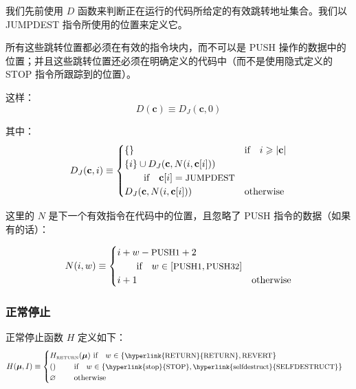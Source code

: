 \documentclass[9pt,oneside]{amsart}
\makeatletter
\newcommand{\linkdest}[1]{\Hy@raisedlink{\hypertarget{#1}{}}}
\makeatother
\begin{document}
\begin{multicols}{2}
我们先前使用 $D$ 函数来判断正在运行的代码所给定的有效跳转地址集合。我们以 {\small JUMPDEST} 指令所使用的位置来定义它。

所有这些跳转位置都必须在有效的指令块内，而不可以是 {\small PUSH} 操作的数据中的位置；并且这些跳转位置还必须在明确定义的代码中（而不是使用隐式定义的 {\small STOP} 指令所跟踪到的位置）。

这样：
\begin{equation}
D(\mathbf{c}) \equiv D_{J}(\mathbf{c}, 0)
\end{equation}

其中：
\begin{equation}
D_{J}(\mathbf{c}, i) \equiv \begin{cases}
\{\} & \text{if} \quad i \geqslant |\mathbf{c}|  \\
\{ i \} \cup D_{J}(\mathbf{c}, N(i, \mathbf{c}[i])) & \\
\quad\quad\text{if} \quad \mathbf{c}[i] = \text{\small JUMPDEST} \\
D_{J}(\mathbf{c}, N(i, \mathbf{c}[i])) & \text{otherwise} \\
\end{cases}
\end{equation}

这里的 $N$ 是下一个有效指令在代码中的位置，且忽略了 {\small PUSH} 指令的数据（如果有的话）：

\begin{equation}
N(i, w) \equiv \begin{cases}
i + w - \text{\small PUSH1} + 2 & \\
\quad\quad\text{if} \quad w \in [\text{\small PUSH1}, \text{\small PUSH32}] \\
i + 1 & \text{otherwise} \end{cases}
\end{equation}

\subsubsection{正常停止}\hypertarget{normal_halting_function_H}{}\linkdest{hhalt}

正常停止函数 $H$ 定义如下：
\begin{equation}
H(\boldsymbol{\mu}, I) \equiv \begin{cases}
H_{\text{\tiny RETURN}}(\boldsymbol{\mu}) \ \text{if} \quad w \in \{\text{\small \hyperlink{RETURN}{RETURN}}, \text{\small REVERT}\} &\\
() \quad\quad\ \text{if} \quad w \in \{ \text{\small \hyperlink{stop}{STOP}}, \text{\small \hyperlink{selfdestruct}{SELFDESTRUCT}} \} &\\
\varnothing \quad\quad\ \text{otherwise}&
\end{cases}
\end{equation}


\end{multicols}
\end{document}
